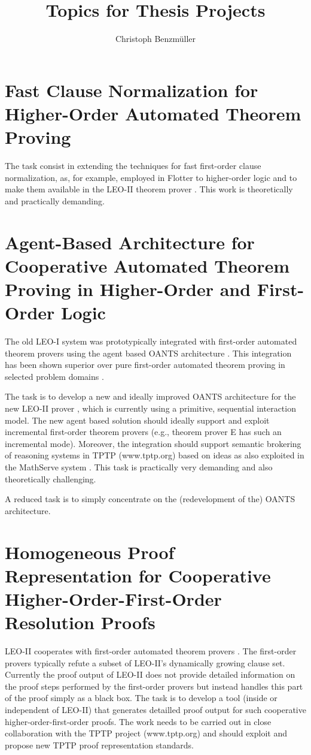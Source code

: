 \documentclass{article}
\title{Topics for Thesis Projects}
\author{Christoph Benzm\"uller}
\begin{document}
\maketitle

\section{Fast Clause Normalization for Higher-Order  Automated Theorem Proving}
The task consist in extending the techniques for fast first-order
clause normalization, as, for example, employed in Flotter
\cite{DBLP:conf/cade/WeidenbachGR96} to higher-order logic
\cite{Andrews86} and to make them available in the LEO-II theorem
prover \cite{C26}. This work is theoretically and practically demanding.

\section{Agent-Based Architecture for Cooperative Automated Theorem Proving in Higher-Order and First-Order Logic}
The old LEO-I system \cite{C3} was prototypically integrated with
first-order automated theorem provers using the agent based OANTS
architecture \cite{C6,C7,C8}. This integration has been shown superior
over pure first-order automated theorem proving in selected problem
domains \cite{J16}.

The task is to develop a new and ideally improved OANTS architecture
for the new LEO-II prover \cite{C26}, which is currently using a
primitive, sequential interaction model. The new agent based solution
should ideally support and exploit incremental first-order theorem
provers (e.g., theorem prover E \cite{Sch02-AICOMM} has such an incremental mode).
Moreover, the integration should support semantic brokering of reasoning systems in TPTP (www.tptp.org)
based on ideas as also exploited in the MathServe system \cite{DBLP:conf/cade/ZimmerA06}.
This task is practically very demanding and also theoretically challenging.

A reduced task is to simply concentrate on the (redevelopment of the) OANTS architecture.


\section{Homogeneous Proof Representation for Cooperative Higher-Order-First-Order Resolution Proofs}
LEO-II cooperates with first-order automated theorem provers
\cite{C26}. The first-order provers typically refute a subset of
LEO-II's dynamically growing clause set. Currently the proof output of
LEO-II does not provide detailed information on the proof steps
performed by the first-order provers but instead handles this part of
the proof simply as a black box. The task is to develop a tool (inside or independent
of LEO-II) that generates detailled proof output for such cooperative higher-order-first-order
proofs. The work needs to be carried out in close collaboration with the TPTP project (www.tptp.org)
and should exploit and propose new TPTP proof representation standards. 
\end{document}

